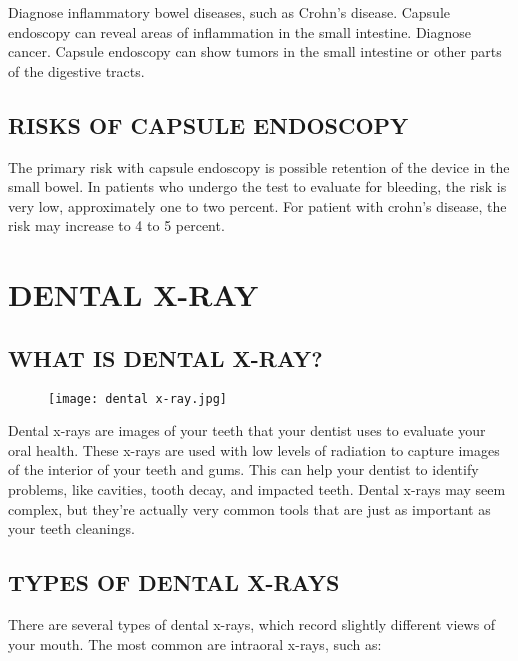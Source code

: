 \documentclass[12pt]{article}
\begin{document}
{\large Diagnose inflammatory bowel diseases, such as Crohn's disease. Capsule endoscopy can reveal areas of inflammation in the small intestine. Diagnose cancer. Capsule endoscopy can show tumors in the small intestine or other parts of the digestive tracts.}



\subsection{RISKS OF CAPSULE ENDOSCOPY}


{\large The primary risk with capsule endoscopy is possible retention of the device in the small bowel. In patients who undergo the test to evaluate for bleeding, the risk is very low, approximately one to two percent. For patient with crohn's disease, the risk may increase to 4 to 5 percent.}





\section{DENTAL X-RAY}

\subsection{WHAT IS DENTAL X-RAY?}

\begin{figure}[h]
\centering
\texttt{[image: dental x-ray.jpg]}
\end{figure}


{\large Dental x-rays are images of your teeth that your dentist uses to evaluate your oral health. These x-rays are used with low levels of radiation to capture images of the interior of your teeth and gums. This can help your dentist to identify problems, like cavities, tooth decay, and impacted teeth. Dental x-rays may seem complex, but they're actually very common tools that are just as important as your teeth cleanings.}


\subsection{TYPES OF DENTAL X-RAYS}

{\large There are several types of dental x-rays, which record slightly different views of your mouth. The most common are intraoral x-rays, such as:}
\end{document}
